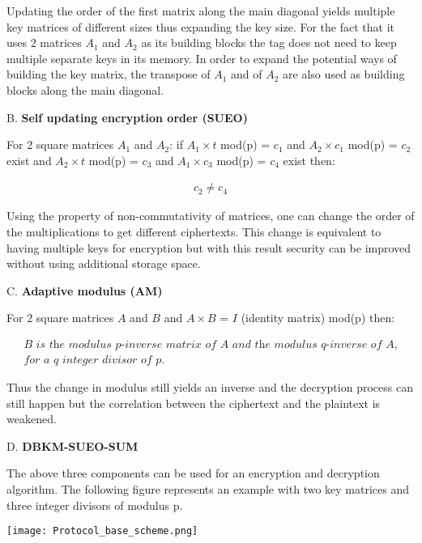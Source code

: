     Updating the order of the first matrix along the main diagonal yields multiple key matrices of different sizes thus expanding the key size. For the fact that 
    it uses 2 matrices $A_1$ and $A_2$ as its building blocks the tag does not need to keep multiple separate keys in its memory. In order to expand the potential
    ways of building the key matrix, the transpose of $A_1$ and  of $A_2$ are also used as building blocks along the main diagonal.

    B. \textbf{Self updating encryption order (SUEO)}

    For 2 square matrices $A_1$ and $A_2$: if $A_1 \times t$ mod(p) = $c_1$ and $A_2 \times c_1$ mod(p) = $c_2$ exist and $A_2 \times t$ mod(p) = $c_3$ and 
    $A_1 \times c_3$ mod(p) = $c_4$ exist then: 
    
    \begin{gather*}
        c_2 \neq c_4
    \end{gather*}

    Using the property of non-commutativity of matrices, one can change the order of the multiplications to get different ciphertexts. This change is equivalent to having multiple keys for
    encryption but with this result security can be improved without using additional storage space.

    C. \textbf{Adaptive modulus (AM)}

    For 2 square matrices $A$ and $B$ and $A \times B$ = $I$ (identity matrix) mod(p) then: 
    
    \begin{gather*}
        \textit{B is the modulus p-inverse matrix of A and the modulus q-inverse of A,}\\
        \textit{for a q integer divisor of p.}
    \end{gather*}

    Thus the change in modulus still yields an inverse and the decryption process can still happen but the correlation between the ciphertext and the plaintext is weakened.

    D. \textbf{DBKM-SUEO-SUM}

    The above three components can be used for an encryption and decryption algorithm. The following figure represents an example with two key matrices and three
    integer divisors of modulus p.

    \begin{center}
    \texttt{[image: Protocol\_base\_scheme.png]}
    \end{center}

